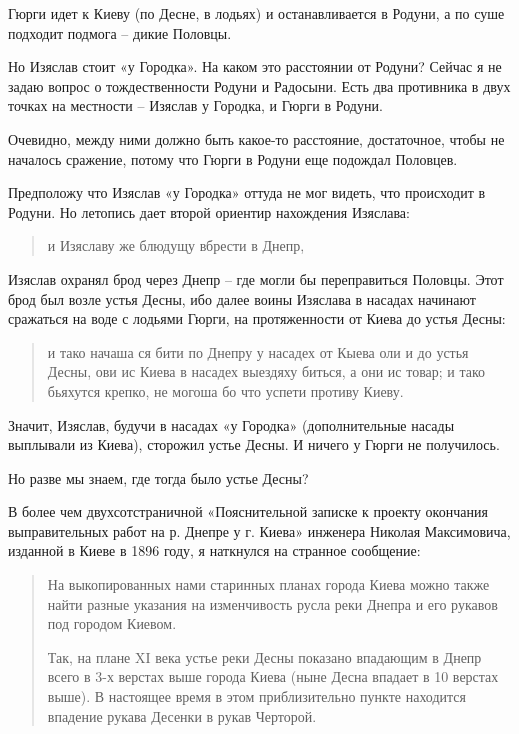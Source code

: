Гюрги идет к Киеву (по Десне, в лодьях) и останавливается в Родуни, а по суше подходит подмога – дикие Половцы.

Но Изяслав стоит «у Городка». На каком это расстоянии от Родуни? Сейчас я не задаю вопрос о тождественности Родуни и Радосыни. Есть два противника в двух точках на местности – Изяслав у Городка, и Гюрги в Родуни.

Очевидно, между ними должно быть какое-то расстояние, достаточное, чтобы не началось сражение, потому что Гюрги в Родуни еще подождал Половцев.

Предположу что Изяслав «у Городка» оттуда не мог видеть, что происходит в Родуни. Но летопись дает второй ориентир нахождения Изяслава: 

\begin{quotation}
и Изяславу же блюдущу вбрести в Днепр,
\end{quotation}

Изяслав охранял брод через Днепр – где могли бы переправиться Половцы. Этот брод был возле устья Десны, ибо далее воины Изяслава в насадах начинают сражаться на воде с лодьями Гюрги, на протяженности от Киева до устья Десны:

\begin{quotation}
и тако начаша ся бити по Днепру у насадех от Кыева оли и до устья Десны, ови ис Киева в насадех выездяху биться, а они ис товар; и тако бьяхутся крепко, не могоша бо что успети противу Киеву. 
\end{quotation}

Значит, Изяслав, будучи в насадах «у Городка» (дополнительные насады выплывали из Киева), сторожил устье Десны. И ничего у Гюрги не получилось.

Но разве мы знаем, где тогда было устье Десны?

В более чем двухсотстраничной «Пояснительной записке к проекту окончания выправительных работ на р. Днепре у г. Киева» инженера Николая Максимовича, изданной в Киеве в 1896 году, я наткнулся на странное сообщение:

\begin{quotation}
На выкопированных нами старинных планах города Киева можно также найти разные указания на изменчивость русла реки Днепра и его рукавов под городом Киевом.

Так, на плане XI века устье реки Десны показано впадающим в Днепр всего в 3-х верстах выше города Киева (ныне Десна впадает в 10 верстах выше). В настоящее время в этом приблизительно пункте находится впадение рукава Десенки в рукав Черторой.
\end{quotation}

